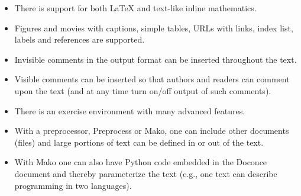 \documentclass[%
oneside,                 %
final,                   %
10pt]{article}
\begin{document}
\begin{itemize}
  \item There is support for both {\LaTeX} and text-like inline mathematics.

  \item Figures and movies with captions, simple tables,
    URLs with links, index list, labels and references are supported.

  \item Invisible comments in the output format can be inserted throughout
    the text.

  \item Visible comments can be inserted so that authors and readers can
    comment upon the text (and at any time turn on/off output of such
    comments).

  \item There is an exercise environment with many advanced features.

  \item With a preprocessor, Preprocess or Mako, one can include
    other documents (files) and large portions of text can be defined
    in or out of the text.

  \item With Mako one can also have Python code
    embedded in the Doconce document and thereby parameterize the
    text (e.g., one text can describe programming in two languages).
\end{itemize}
\end{document}
